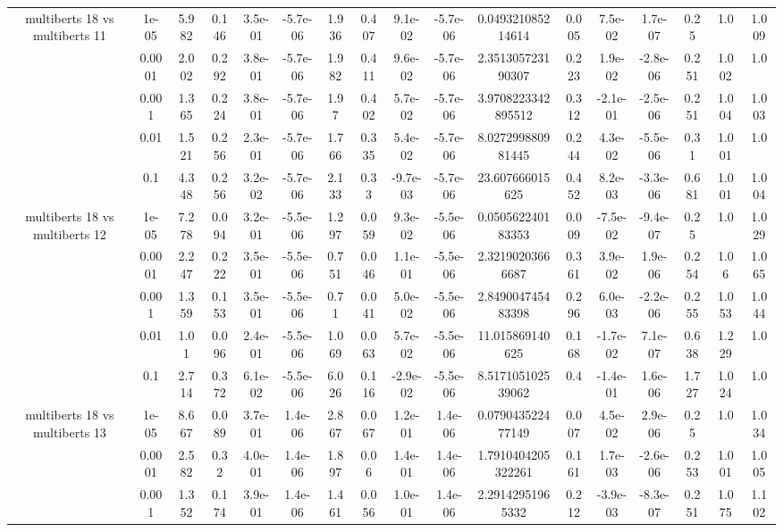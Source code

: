 \begin{tabular}{|c|c|c|c|c|c|c|c|c|c|c|c|c|c|c|c|c|}
\hline
\multirow{5}{*}{multiberts 18 vs multiberts 11} & 1e-05 & 5.982 & 0.146 & 3.5e-01 & -5.7e-06 & 1.936 & 0.407 & 9.1e-02 & -5.7e-06 & 0.049321085214614 & 0.005 & 7.5e-02 & 1.7e-07 & 0.25 & 1.0 & 1.009 \\
 & 0.0001 & 2.002 & 0.292 & 3.8e-01 & -5.7e-06 & 1.982 & 0.411 & 9.6e-02 & -5.7e-06 & 2.351305723190307 & 0.223 & 1.9e-02 & -2.8e-06 & 0.251 & 1.002 & 1.0 \\
 & 0.001 & 1.365 & 0.224 & 3.8e-01 & -5.7e-06 & 1.97 & 0.402 & 5.7e-02 & -5.7e-06 & 3.9708223342895512 & 0.312 & -2.1e-01 & -2.5e-06 & 0.251 & 1.004 & 1.003 \\
 & 0.01 & 1.521 & 0.256 & 2.3e-01 & -5.7e-06 & 1.766 & 0.335 & 5.4e-02 & -5.7e-06 & 8.027299880981445 & 0.244 & 4.3e-02 & -5.5e-06 & 0.31 & 1.001 & 1.0 \\
 & 0.1 & 4.348 & 0.256 & 3.2e-02 & -5.7e-06 & 2.133 & 0.33 & -9.7e-03 & -5.7e-06 & 23.607666015625 & 0.452 & 8.2e-03 & -3.3e-06 & 0.681 & 1.001 & 1.004 \\
\hline
\multirow{5}{*}{multiberts 18 vs multiberts 12} & 1e-05 & 7.278 & 0.094 & 3.2e-01 & -5.5e-06 & 1.297 & 0.059 & 9.3e-02 & -5.5e-06 & 0.050562240183353 & 0.009 & -7.5e-02 & -9.4e-07 & 0.25 & 1.0 & 1.029 \\
 & 0.0001 & 2.247 & 0.222 & 3.5e-01 & -5.5e-06 & 0.751 & 0.046 & 1.1e-01 & -5.5e-06 & 2.32190203666687 & 0.361 & 3.9e-02 & 1.9e-06 & 0.254 & 1.06 & 1.065 \\
 & 0.001 & 1.359 & 0.153 & 3.5e-01 & -5.5e-06 & 0.71 & 0.041 & 5.0e-02 & -5.5e-06 & 2.849004745483398 & 0.296 & 6.0e-03 & -2.2e-06 & 0.255 & 1.053 & 1.044 \\
 & 0.01 & 1.01 & 0.096 & 2.4e-01 & -5.5e-06 & 1.069 & 0.063 & 5.7e-02 & -5.5e-06 & 11.015869140625 & 0.168 & -1.7e-02 & 7.1e-07 & 0.638 & 1.229 & 1.0 \\
 & 0.1 & 2.714 & 0.372 & 6.1e-02 & -5.5e-06 & 6.026 & 0.116 & -2.9e-02 & -5.5e-06 & 8.517105102539062 & 0.4 & -1.4e-01 & 1.6e-06 & 1.727 & 1.024 & 1.0 \\
\hline
\multirow{5}{*}{multiberts 18 vs multiberts 13} & 1e-05 & 8.667 & 0.089 & 3.7e-01 & 1.4e-06 & 2.867 & 0.067 & 1.2e-01 & 1.4e-06 & 0.079043522477149 & 0.007 & 4.5e-02 & 2.9e-06 & 0.25 & 1.0 & 1.034 \\
 & 0.0001 & 2.582 & 0.32 & 4.0e-01 & 1.4e-06 & 1.897 & 0.06 & 1.4e-01 & 1.4e-06 & 1.7910404205322261 & 0.161 & 1.7e-03 & -2.6e-06 & 0.253 & 1.001 & 1.005 \\
 & 0.001 & 1.352 & 0.174 & 3.9e-01 & 1.4e-06 & 1.461 & 0.056 & 1.0e-01 & 1.4e-06 & 2.29142951965332 & 0.212 & -3.9e-03 & -8.3e-07 & 0.251 & 1.075 & 1.102 \\

\end{tabular}
